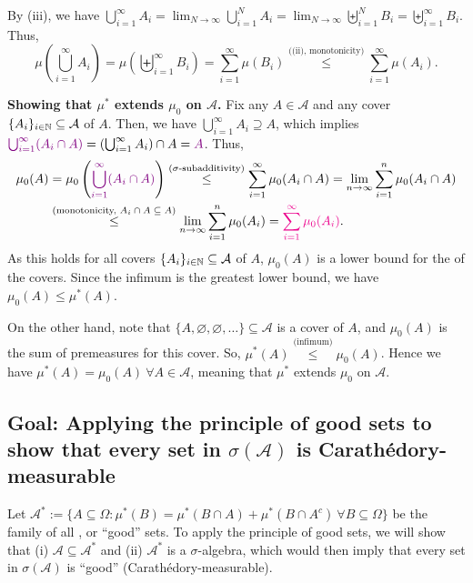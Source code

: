 \begin{enumerate}
\begin{pf}
\begin{itemize}
By (iii), we have \(\bigcup_{i=1}^{\infty}A_i
=\lim_{N\to\infty}\bigcup_{i=1}^{N}A_i =\lim_{N\to\infty}\biguplus_{i=1}^{N}B_i
=\biguplus_{i=1}^{\infty}B_i \). Thus,
\[
\mu\left(\bigcup_{i=1}^{\infty}A_i\right)
=\mu\left(\biguplus_{i=1}^{\infty}B_i\right)
=\sum_{i=1}^{\infty}\mu(B_i)
\overset{\text{((ii), monotonicity)}}{\le}\sum_{i=1}^{\infty}\mu(A_i).
\]
\end{itemize}
\textbf{Showing that \(\mu^*\) extends \(\mu_0\) on \(\mathcal{A}\).} Fix any
\(A\in\mathcal{A}\) and any cover \(\{A_{i}\}_{i\in\mathbb{N}}\subseteq \mathcal{A}\)
of \(A\). Then, we have \(\bigcup_{i=1}^{\infty}A_i\supseteq A\), which implies
\(\vc{\bigcup_{i=1}^{\infty}(A_i\cap A)}=\left(\bigcup_{i=1}^{\infty}A_i\right)\cap A=\vc{A}\). Thus,
\begin{align*}
\mu_0(A)&=\mu_0\left(\vc{\bigcup_{i=1}^{\infty}(A_i\cap A)}\right)
\overset{\text{(\(\sigma\)-subadditivity)}}{\le}
\sum_{i=1}^{\infty}\mu_0(A_i\cap A)
=\lim_{n\to\infty}\sum_{i=1}^{n}\mu_0(A_i\cap A) \\
&\overset{\text{(monotonicity, \(A_i\cap A\subseteq A\))}}{\le}
\lim_{n\to\infty}\sum_{i=1}^{n}\mu_0(A_i)
=\mgc{\sum_{i=1}^{\infty}\mu_0(A_i)}.
\end{align*}
As this holds for all covers \(\{A_{i}\}_{i\in\mathbb{N}}\subseteq \mathcal{A}\) of
\(A\), \(\mu_0(A)\) is a lower bound for the  of the covers.
Since the infimum is the greatest lower bound, we have
\(\mu_0(A)\le\mu^*(A)\).

On the other hand, note that \(\{A,\varnothing,\varnothing,\dotsc\}\subseteq
\mathcal{A}\) is a cover of \(A\), and \(\mu_0(A)\) is the sum of premeasures
for this cover. So, \(\mu^*(A)\overset{\text{(infimum)}}{\le}\mu_0(A)\). Hence
we have \(\mu^*(A)=\mu_0(A)~\forall A\in\mathcal{A}\), meaning that \(\mu^*\)
extends \(\mu_0\) on \(\mathcal{A}\).

\subsection*{Goal: Applying the principle of good sets to show that every set in
\(\sigma(\mathcal{A})\) is Carath\'edory-measurable}
Let \(\mathcal{A^*}:=\{A\subseteq \Omega:\mu^*(B)=\mu^*(B\cap A)+\mu^*(B\cap
A^c)~\forall B\subseteq \Omega\}\) be the family of all
, or ``good'' sets. To apply the principle
of good sets, we will show that (i) \(\mathcal{A}\subseteq \mathcal{A}^*\) and
(ii) \(\mathcal{A}^*\) is a \(\sigma\)-algebra, which would then imply that
every set in \(\sigma(\mathcal{A})\) is ``good'' (Carath\'edory-measurable).


\end{pf}
\end{enumerate}
